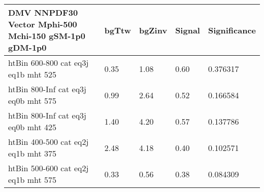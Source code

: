  \begin{tabular}{|l|l|l|l|l|}
\small
   \label{mostSensitiveBins_DMV_NNPDF30_Vector_Mphi-500_Mchi-150_gSM-1p0_gDM-1p0_25ns}
	\textbf{DMV NNPDF30 Vector Mphi-500 Mchi-150 gSM-1p0 gDM-1p0}	 & 	bgTtw	 & 	bgZinv	 & 	Signal &	 Significance \\ 
	\hline
	htBin 600-800 cat eq3j eq1b mht 525 & 	0.35	 & 	1.08	 & 	0.60 	&0.376317 \\ 
	htBin 800-Inf cat eq3j eq0b mht 575 & 	0.99	 & 	2.64	 & 	0.52 	&0.166584 \\ 
	htBin 800-Inf cat eq3j eq0b mht 425 & 	1.40	 & 	4.20	 & 	0.57 	&0.137786 \\ 
	htBin 400-500 cat eq2j eq1b mht 375 & 	2.48	 & 	4.18	 & 	0.40 	&0.102571 \\ 
	htBin 500-600 cat eq2j eq1b mht 575 & 	0.33	 & 	0.56	 & 	0.38 	&0.084309 \\ 
\end{tabular}
